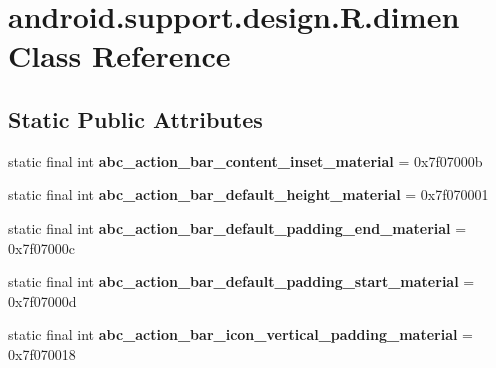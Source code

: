 \hypertarget{classandroid_1_1support_1_1design_1_1_r_1_1dimen}{}\section{android.\+support.\+design.\+R.\+dimen Class Reference}
\label{classandroid_1_1support_1_1design_1_1_r_1_1dimen}
\subsection*{Static Public Attributes}
\begin{DoxyCompactItemize}
\item 
\hypertarget{classandroid_1_1support_1_1design_1_1_r_1_1dimen_af42ca9b71c928b25b27c7037a575693b}{}static final int {\bfseries abc\+\_\+action\+\_\+bar\+\_\+content\+\_\+inset\+\_\+material} = 0x7f07000b\label{classandroid_1_1support_1_1design_1_1_r_1_1dimen_af42ca9b71c928b25b27c7037a575693b}

\item 
\hypertarget{classandroid_1_1support_1_1design_1_1_r_1_1dimen_ab992b60379bc68bf6d348760955ad8a6}{}static final int {\bfseries abc\+\_\+action\+\_\+bar\+\_\+default\+\_\+height\+\_\+material} = 0x7f070001\label{classandroid_1_1support_1_1design_1_1_r_1_1dimen_ab992b60379bc68bf6d348760955ad8a6}

\item 
\hypertarget{classandroid_1_1support_1_1design_1_1_r_1_1dimen_a25e4e04e667bdfbbf4bcdbced1b7d1b4}{}static final int {\bfseries abc\+\_\+action\+\_\+bar\+\_\+default\+\_\+padding\+\_\+end\+\_\+material} = 0x7f07000c\label{classandroid_1_1support_1_1design_1_1_r_1_1dimen_a25e4e04e667bdfbbf4bcdbced1b7d1b4}

\item 
\hypertarget{classandroid_1_1support_1_1design_1_1_r_1_1dimen_a0a52034a97ad09c75057adcb3a6022b1}{}static final int {\bfseries abc\+\_\+action\+\_\+bar\+\_\+default\+\_\+padding\+\_\+start\+\_\+material} = 0x7f07000d\label{classandroid_1_1support_1_1design_1_1_r_1_1dimen_a0a52034a97ad09c75057adcb3a6022b1}

\item 
\hypertarget{classandroid_1_1support_1_1design_1_1_r_1_1dimen_a45c3c747b19ec74e55fa8033393d1ac8}{}static final int {\bfseries abc\+\_\+action\+\_\+bar\+\_\+icon\+\_\+vertical\+\_\+padding\+\_\+material} = 0x7f070018\label{classandroid_1_1support_1_1design_1_1_r_1_1dimen_a45c3c747b19ec74e55fa8033393d1ac8}


\end{DoxyCompactItemize}
